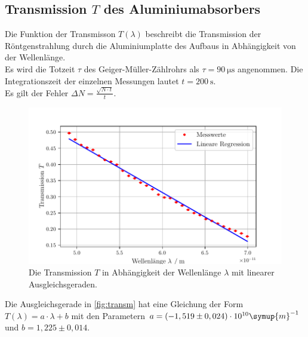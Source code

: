 \subsection{Transmission $T$ des Aluminiumabsorbers}
\label{subsec:transmission}

Die Funktion der Transmisson $T(\lambda)$ beschreibt die Transmission der 
Röntgenstrahlung durch die Aluminiumplatte des Aufbaus in Abhängigkeit von der Wellenlänge.\\

\noindent Es wird die Totzeit $\tau$ des Geiger-Müller-Zählrohrs als $\tau = \SI{90}{\micro\second}$ angenommen. Die 
Integrationszeit der einzelnen Messungen lautet $t = \SI{200}{\second}$. \\
Es gilt der Fehler $\Delta N = \frac{\sqrt{N \cdot t}}{t}$.\\


\begin{figure}[H]
  \centering
  \includegraphics{build/transmission.pdf}
  \caption{Die Transmission $T$ in Abhängigkeit der Wellenlänge $\lambda$ mit linearer Ausgleichsgeraden.}
  \label{fig:transm}
\end{figure}

\noindent Die Ausgleichsgerade in \autoref{fig:transm} hat eine Gleichung der Form $T(\lambda) = a \cdot \lambda + b$ mit 
den Parametern $a = (-1,519 \pm 0,024)\cdot 10^{10}\symup{m}^{-1}$ und $b = 1,225 \pm 0,014$.

